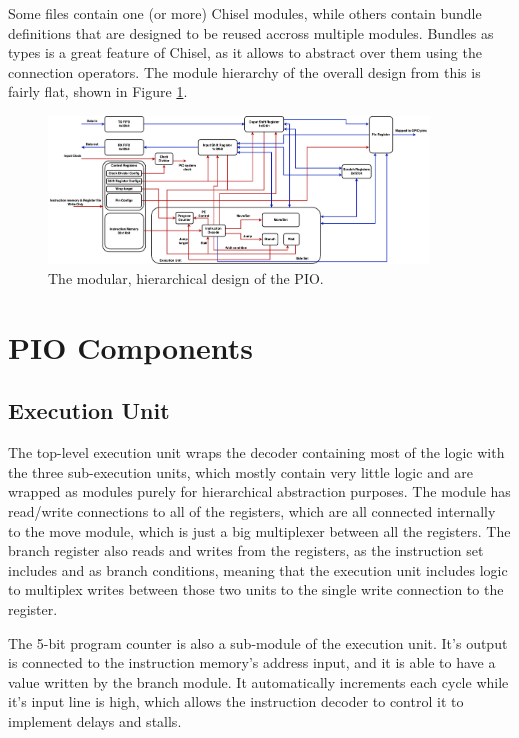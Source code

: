 Some files contain one (or more) Chisel modules, while others contain bundle definitions that are designed to be reused accross multiple modules. Bundles as types is a great feature of Chisel, as it allows to abstract over them using the connection operators. The module hierarchy of the overall design from this is fairly flat, shown in Figure \ref{fig:hdl_hierarchy}.

\begin{figure}[H]
    \centering
    \includegraphics[width=0.9\textwidth]{../img/bd.png}
    \caption{The modular, hierarchical design of the PIO.}
    \label{fig:hdl_hierarchy}
\end{figure}

\section{PIO Components}
\subsection{Execution Unit}

The top-level execution unit wraps the decoder containing most of the logic with the three sub-execution units, which mostly contain very little logic and are wrapped as modules purely for hierarchical abstraction purposes. The module has read/write connections to all of the registers, which are all connected internally to the move module, which is just a big multiplexer between all the registers. The branch register also reads and writes from the registers, as the instruction set includes  and  as branch conditions, meaning that the execution unit includes logic to multiplex writes between those two units to the single write connection to the register.

The 5-bit program counter is also a sub-module of the execution unit. It's output is connected to the instruction memory's address input, and it is able to have a value written by the branch module. It automatically increments each cycle while it's  input line is high, which allows the instruction decoder to control it to implement delays and stalls.

